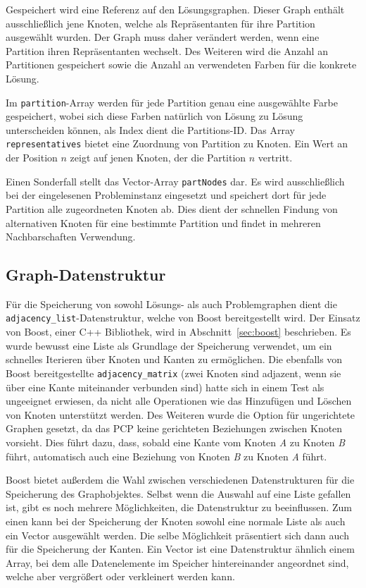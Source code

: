Gespeichert wird eine Referenz auf den Lösungsgraphen. Dieser Graph enthält ausschließlich jene Knoten, welche als Repräsentanten für ihre Partition
ausgewählt wurden. Der Graph muss daher verändert werden, wenn eine Partition ihren Repräsentanten wechselt. Des Weiteren wird die Anzahl an Partitionen
gespeichert sowie die Anzahl an verwendeten Farben für die konkrete Lösung. 

Im \texttt{partition}-Array werden für jede Partition genau eine ausgewählte Farbe gespeichert, wobei sich diese Farben natürlich von Lösung zu Lösung 
unterscheiden können, als Index dient die Partitions-ID\@. Das Array \texttt{representatives} bietet eine Zuordnung von Partition zu Knoten. Ein Wert 
an der Position $n$ zeigt auf jenen Knoten, der die Partition $n$ vertritt.

Einen Sonderfall stellt das Vector-Array \texttt{partNodes} dar. Es wird ausschließlich bei der eingelesenen Probleminstanz eingesetzt und speichert
dort für jede Partition alle zugeordneten Knoten ab. Dies dient der schnellen Findung von alternativen Knoten für eine bestimmte Partition und findet
in mehreren Nachbarschaften Verwendung. 

\subsection{Graph-Datenstruktur}
Für die Speicherung von sowohl Lösungs- als auch Problemgraphen dient die \texttt{adjacency\_list}-Datenstruktur, welche von Boost bereitgestellt wird. Der Einsatz von Boost, einer C++ Bibliothek, wird in Abschnitt~\ref{sec:boost} 
beschrieben. Es wurde bewusst eine Liste als Grundlage der Speicherung verwendet, um ein schnelles Iterieren über Knoten und Kanten zu ermöglichen. Die ebenfalls von Boost be\-reit\-ge\-stel\-lte 
\texttt{adjacency\_matrix} (zwei Knoten sind adjazent, wenn sie über eine Kante miteinander verbunden sind) hatte sich in einem Test als ungeeignet erwiesen, da nicht alle Operationen wie das Hinzufügen und Löschen von Knoten unterstützt werden. Des Weiteren wurde die Option für 
ungerichtete Graphen gesetzt, da das PCP keine gerichteten Beziehungen zwischen Knoten vorsieht. Dies führt dazu, dass, sobald eine Kante vom Knoten \textit{A} zu Knoten \textit{B} führt, automatisch auch
eine Beziehung von Knoten \textit{B} zu Knoten \textit{A} führt.

Boost bietet außerdem die Wahl zwischen verschiedenen Datenstrukturen für die Speicherung des Graphobjektes. Selbst wenn die Auswahl auf eine Liste gefallen ist, gibt es noch mehrere Möglichkeiten, die Datenstruktur
zu beeinflussen. Zum einen kann bei der Speicherung der Knoten sowohl eine normale Liste als auch ein Vector ausgewählt werden. Die selbe Möglichkeit präsentiert sich dann auch für die Speicherung der Kanten.
Ein Vector ist eine Datenstruktur ähnlich einem Array, bei dem alle Datenelemente im Speicher hintereinander angeordnet sind, welche aber vergrößert oder verkleinert werden kann.

